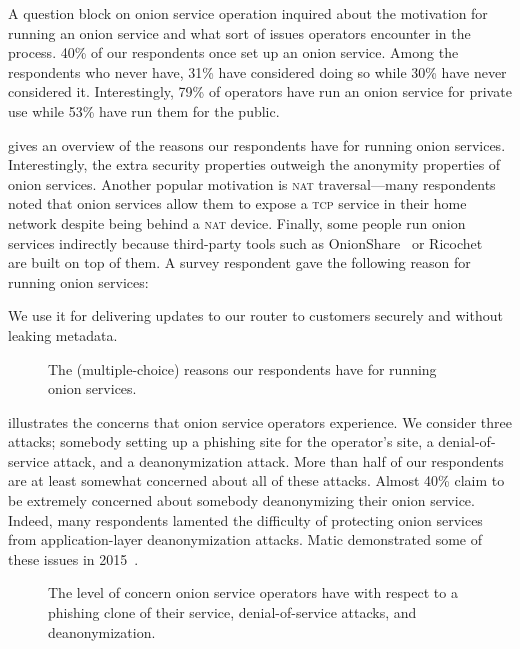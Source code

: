 A question block on onion service operation inquired about the motivation for
running an onion service and what sort of issues operators encounter in the
process.  40\% of our respondents once set up an onion service.  Among the
respondents who never have, 31\% have considered doing so while 30\% have never
considered it.  Interestingly, 79\% of operators have run an onion service for
private use while 53\% have run them for the public.

 gives an overview of the reasons our
respondents have for running onion services.  Interestingly, the extra security
properties outweigh the anonymity properties of onion services.  Another popular
motivation is \textsc{nat} traversal---many respondents noted that onion
services allow them to expose a \textsc{tcp} service in their home network
despite being behind a \textsc{nat} device.  Finally, some people run onion
services indirectly because third-party tools such as
OnionShare~\cite{onionshare} or Ricochet~\cite{ricochet} are built on top of
them.  A survey respondent gave the following reason for running onion services:

\begin{displayquote}
We use it for delivering updates to our router to customers securely and without
leaking metadata.
\end{displayquote}

\begin{figure}[t]
    \centering
    
    \caption{The (multiple-choice) reasons our respondents have for running
    onion services.}
    \label{fig:onion-operation-reasons}
\end{figure}

 illustrates the concerns that onion service
operators experience.  We consider three attacks; \first somebody setting up a
phishing site for the operator's site, \second a denial-of-service attack, and
\third a deanonymization attack.  More than half of our respondents are at least
somewhat concerned about all of these attacks.  Almost 40\% claim to be
extremely concerned about somebody deanonymizing their onion service.  Indeed,
many respondents lamented the difficulty of protecting onion services from
application-layer deanonymization attacks.  Matic \ea demonstrated some of these
issues in 2015~\cite{Matic2015a}.

\begin{figure}[t]
    \centering
    
    \caption{The level of concern onion service operators have with respect to a
    phishing clone of their service, denial-of-service attacks, and
    deanonymization.}
    \label{fig:onion-operation-concerns}
\end{figure}

